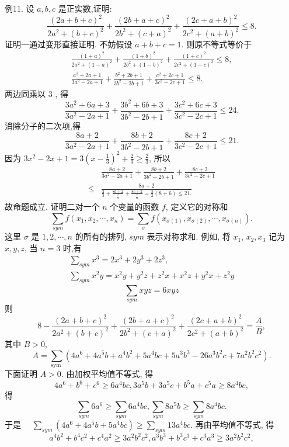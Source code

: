 例11. 设 $a, b, c$ 是正实数,证明:
$$
\frac{(2 a+b+c)^2}{2 a^2+(b+c)^2}+\frac{(2 b+a+c)^2}{2 b^2+(c+a)^2}+\frac{(2 c+a+b)^2}{2 c^2+(a+b)^2} \leqslant 8 .
$$
证明一通过变形直接证明.
不妨假设 $a+b+c=1$. 则原不等式等价于
$$
\begin{gathered}
\frac{(1+a)^2}{2 a^2+(1-a)^2}+\frac{(1+b)^2}{2 b^2+(1-b)^2}+\frac{(1+c)^2}{2 c^2+(1-c)^2} \leqslant 8, \\
\frac{a^2+2 a+1}{3 a^2-2 a+1}+\frac{b^2+2 b+1}{3 b^2-2 b+1}+\frac{c^2+2 c+1}{3 c^2-2 c+1} \leqslant 8 .
\end{gathered}
$$
两边同乘以 3 , 得
$$
\frac{3 a^2+6 a+3}{3 a^2-2 a+1}+\frac{3 b^2+6 b+3}{3 b^2-2 b+1}+\frac{3 c^2+6 c+3}{3 c^2-2 c+1} \leqslant 24 .
$$
消除分子的二次项,得
$$
\frac{8 a+2}{3 a^2-2 a+1}+\frac{8 b+2}{3 b^2-2 b+1}+\frac{8 c+2}{3 c^2-2 c+1} \leqslant 21 .
$$
因为 $3 x^2-2 x+1=3\left(x-\frac{1}{3}\right)^2+\frac{2}{3} \geqslant \frac{2}{3}$, 所以
$$
\begin{aligned}
& \frac{8 a+2}{3 a^2-2 a+1}+\frac{8 b+2}{3 b^2-2 b+1}+\frac{8 c+2}{3 c^2-2 c+1} \\
\leqslant & \frac{8 a+2}{\frac{2}{3}+\frac{8 b+2}{\frac{2}{3}}+\frac{8 c+2}{\frac{2}{3}}=\frac{3}{2}(8+6) \leqslant 21 .}
\end{aligned}
$$
故命题成立.
证明二对一个 $n$ 个变量的函数 $f$, 定义它的对称和
$$
\sum_{s y m} f\left(x_1, x_2, \cdots, x_n\right)=\sum_\sigma f\left(x_{\sigma(1)}, x_{\sigma(2)}, \cdots, x_{\sigma(n)}\right) .
$$
这里 $\sigma$ 是 $1,2, \cdots, n$ 的所有的排列, $s y m$ 表示对称求和.
例如, 将 $x_1$, $x_2, x_3$ 记为 $x, y, z$, 当 $n=3$ 时,有
$$
\begin{gathered}
\sum_{s y m} x^3=2 x^3+2 y^3+2 z^3, \\
\sum_{s y m} x^2 y=x^2 y+y^2 z+z^2 x+x^2 z+y^2 x+z^2 y
\end{gathered}
$$
$$
\sum_{s y m} x y z=6 x y z
$$
则
$$
8-\frac{(2 a+b+c)^2}{2 a^2+(b+c)^2}+\frac{(2 b+a+c)^2}{2 b^2+(c+a)^2}+\frac{(2 c+a+b)^2}{2 c^2+(a+b)^2}=\frac{A}{B},
$$
其中 $B>0$,
$$
A=\sum_{\text {sym }}\left(4 a^6+4 a^5 b+a^4 b^2+5 a^4 b c+5 a^3 b^3-26 a^3 b^2 c+7 a^2 b^2 c^2\right) .
$$
下面证明 $A>0$.
由加权平均值不等式, 得
$$
4 a^6+b^6+c^6 \geqslant 6 a^4 b c, 3 a^5 b+3 a^5 c+b^5 a+c^5 a \geqslant 8 a^4 b c,
$$
得
$$
\sum_{s y m} 6 a^6 \geqslant \sum_{s y m} 6 a^4 b c, \sum_{s y m} 8 a^5 b \geqslant \sum_{s y m} 8 a^4 b c .
$$
于是 $\quad \sum_{s y m}\left(4 a^6+4 a^5 b+5 a^4 b c\right) \geqslant \sum_{s y m} 13 a^4 b c$.
再由平均值不等式, 得
$$
a^4 b^2+b^4 c^2+c^4 a^2 \geqslant 3 a^2 b^2 c^2, a^3 b^3+b^3 c^3+c^3 a^3 \geqslant 3 a^2 b^2 c^2,
$$
